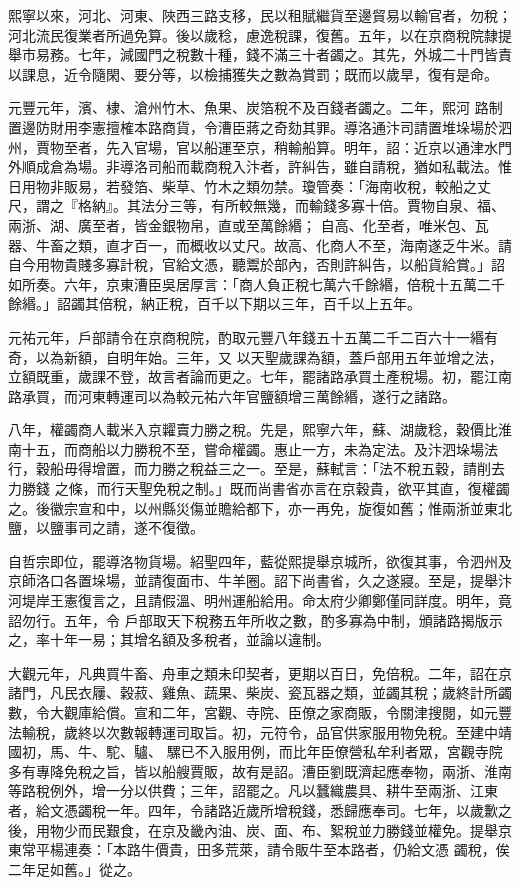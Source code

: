 \begin{pinyinscope}
 熙寧以來，河北、河東、陜西三路支移，民以租賦繼貨至邊貿易以輸官者，勿稅；河北流民復業者所過免算。後以歲稔，慮逸稅課，復舊。五年，以在京商稅院隸提舉市易務。七年，減國門之稅數十種，錢不滿三十者蠲之。其先，外城二十門皆責以課息，近令隨閑、要分等，以檢捕獲失之數為賞罰；既而以歲旱，復有是命。



 元豐元年，濱、棣、滄州竹木、魚果、炭箔稅不及百錢者蠲之。二年，熙河
 路制置邊防財用李憲擅榷本路商貨，令漕臣蔣之奇劾其罪。導洛通汴司請置堆垛場於泗州，賈物至者，先入官場，官以船運至京，稍輸船算。明年，詔：近京以通津水門外順成倉為場。非導洛司船而載商稅入汴者，許糾告，雖自請稅，猶如私載法。惟日用物非販易，若發箔、柴草、竹木之類勿禁。瓊管奏：「海南收稅，較船之丈尺，謂之『格納』。其法分三等，有所較無幾，而輸錢多寡十倍。賈物自泉、福、兩浙、湖、廣至者，皆金銀物帛，直或至萬餘緡；
 自高、化至者，唯米包、瓦器、牛畜之類，直才百一，而概收以丈尺。故高、化商人不至，海南遂乏牛米。請自今用物貴賤多寡計稅，官給文憑，聽鬻於部內，否則許糾告，以船貨給賞。」詔如所奏。六年，京東漕臣吳居厚言：「商人負正稅七萬六千餘緡，倍稅十五萬二千餘緡。」詔蠲其倍稅，納正稅，百千以下期以三年，百千以上五年。



 元祐元年，戶部請令在京商稅院，酌取元豐八年錢五十五萬二千二百六十一緡有奇，以為新額，自明年始。三年，又
 以天聖歲課為額，蓋戶部用五年並增之法，立額既重，歲課不登，故言者論而更之。七年，罷諸路承買土產稅場。初，罷江南路承買，而河東轉運司以為較元祐六年官鹽額增三萬餘緡，遂行之諸路。



 八年，權蠲商人載米入京糶賣力勝之稅。先是，熙寧六年，蘇、湖歲稔，穀價比淮南十五，而商船以力勝稅不至，嘗命權蠲。惠止一方，未為定法。及汴泗垛場法行，穀船毋得增置，而力勝之稅益三之一。至是，蘇軾言：「法不稅五穀，請削去力勝錢
 之條，而行天聖免稅之制。」既而尚書省亦言在京穀貴，欲平其直，復權蠲之。後徽宗宣和中，以州縣災傷並贍給都下，亦一再免，旋復如舊；惟兩浙並東北鹽，以鹽事司之請，遂不復徵。



 自哲宗即位，罷導洛物貨場。紹聖四年，藍從熙提舉京城所，欲復其事，令泗州及京師洛口各置垛場，並請復面市、牛羊圈。詔下尚書省，久之遂寢。至是，提舉汴河堤岸王憲復言之，且請假溫、明州運船給用。命太府少卿鄭僅同詳度。明年，竟詔勿行。五年，令
 戶部取天下稅務五年所收之數，酌多寡為中制，頒諸路揭版示之，率十年一易；其增名額及多稅者，並論以違制。



 大觀元年，凡典買牛畜、舟車之類未印契者，更期以百日，免倍稅。二年，詔在京諸門，凡民衣屨、穀菽、雞魚、蔬果、柴炭、瓷瓦器之類，並蠲其稅；歲終計所蠲數，令大觀庫給償。宣和二年，宮觀、寺院、臣僚之家商販，令關津搜閱，如元豐法輸稅，歲終以次數報轉運司取旨。初，元符令，品官供家服用物免稅。至建中靖國初，馬、牛、駝、驢、
 騾已不入服用例，而比年臣僚營私牟利者眾，宮觀寺院多有專降免稅之旨，皆以船艘賈販，故有是詔。漕臣劉既濟起應奉物，兩浙、淮南等路稅例外，增一分以供費；三年，詔罷之。凡以蠶織農具、耕牛至兩浙、江東者，給文憑蠲稅一年。四年，令諸路近歲所增稅錢，悉歸應奉司。七年，以歲歉之後，用物少而民艱食，在京及畿內油、炭、面、布、絮稅並力勝錢並權免。提舉京東常平楊連奏：「本路牛價貴，田多荒萊，請令販牛至本路者，仍給文憑
 蠲稅，俟二年足如舊。」從之。




\end{pinyinscope}
